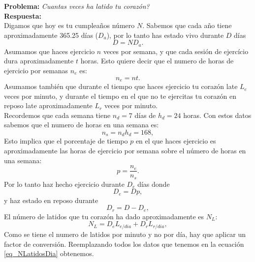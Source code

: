 \begin{example}
\small
\begin{tcolorbox}[colback=green!5!white,colframe=green!75!black,boxrule=0.5pt,arc=4pt,left=6pt,right=6pt,top=6pt,bottom=6pt,boxsep=0pt]
\textbf{Problema:} \textit{Cuantas veces ha latido tu corazón?}\\
\textbf{Respuesta:}\\ 
Digamos que hoy es tu cumplea\~nos n\'umero $N$. Sabemos que cada a\~no tiene aproximadamente 365.25 d\'ias ($D_a$), por lo tanto has estado vivo durante $D$ d\'ias \\
\begin{equation}
D = N D_{a}.
\end{equation}
Asumamos que haces ejercicio $n$ veces por semana, y que cada sesi\'on de ejercício dura aproximadamente $t$ horas. Esto quiere decir que el numero de horas de ejercicio por semanas $n_e$ es:
\begin{equation}
n_e = nt.
\end{equation} 
Asumamos tambi\'en que durante el tiempo que haces ejercicio tu coraz\'on late $L_{e}$ veces por minuto, y durante el tiempo en el que no te ejercitas tu coraz\'on en reposo late aproximadamente $L_{r}$ veces por minuto. \\
Recordemos que cada semana tiene $n_d = 7$ d\'ias de $h_d = 24$ horas. Con estos datos sabemos que el numero de horas en una semana es:
\begin{equation}
n_s = n_d h_d = 168,
\end{equation}
Esto implica que el porcentaje de tiempo $p$ en el que haces ejercicio es aproximadamente las horas de ejercicio por semana sobre el n\'umero de horas en una semana:
\begin{equation}
p = \frac{n_e}{n_s}. 
\end{equation}
Por lo tanto haz hecho ejercicio durante $D_e$ d\'ias donde
\begin{equation}
D_e = D p, 
\end{equation} 
y haz estado en reposo durante
\begin{equation}
D_r = D - D_e, 
\end{equation} 
El n\'umero de latidos que tu coraz\'on ha dado aproximadamente es $N_L$:  
\begin{equation}
\label{eq_NLatidosDia}
N_L = D_e L_{e/dia}  + D_r L_{r/dia}, 
\end{equation} 
Como se tiene el numero de latidos por minuto y no por d\'ia, hay que aplicar un factor de conversi\'on. Reemplazando todos los datos que tenemos en la ecuaci\'on \ref{eq_NLatidosDia} obtenemos. 

\end{tcolorbox}
\end{example}
